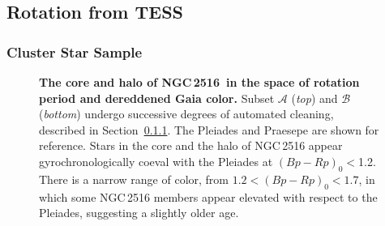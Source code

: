 \documentclass[12pt,twocolumn,tighten]{aastex63}
\newcommand{\cn}{NGC\,2516} %
\begin{document}
\subsection{Rotation from TESS}
\label{subsec:tess}

\subsubsection{Cluster Star Sample}
\label{subsubsec:cluster}

\begin{figure}[t]
	\begin{center}
		\leavevmode
	\end{center}
	\vspace{-0.7cm}
  \caption{ {\bf The core and halo of \cn\ in the space of rotation
    period and dereddened Gaia color.}
    Subset $\mathcal{A}$ ({\it top}) and $\mathcal{B}$ ({\it bottom})
    undergo successive degrees of automated cleaning, described in Section~\ref{subsubsec:cluster}.
    The Pleiades \citep[120\,Myr;][]{rebull_rotation_2016a} and
    Praesepe \citep[650\,Myr;][]{douglas_poking_2017} are shown for
    reference.
    Stars in the core and the halo of NGC\,2516 appear
    gyrochronologically coeval with the Pleiades at $(Bp-Rp)_0$$<$1.2.
    There is a narrow range of color, from $1.2<(Bp-Rp)_0<1.7$,
    in which some NGC\,2516 members appear elevated with respect to
    the Pleiades, suggesting a slightly older age.
		\label{fig:rot}
	}
\end{figure}
\end{document}
